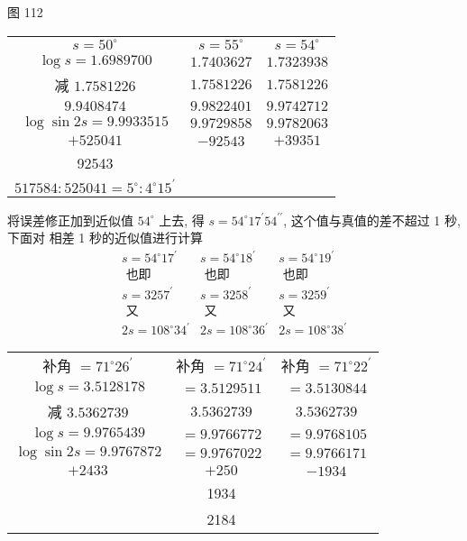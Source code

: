 图 112 

\begin{tabular}{ccc}
$s=50^{\circ}$ & $s=55^{\circ}$ & $s=54^{\circ}$ \\
$\log s=1.6989700$ & $1.7403627$ & $1.7323938$ \\
减 $1.7581226$ & $1.7581226$ & $1.7581226$ \\
\hline $9.9408474$ & $9.9822401$ & $9.9742712$ \\
$\log \sin 2 s=9.9933515$ & $9.9729858$ & $9.9782063$ \\
\hline$+525041$ & $-92543$ & $+39351$ \\
92543 & \\
\hline $517584: 525041=5^{\circ}: 4^{\circ} 15^{\prime}$ &
\end{tabular}

将误差修正加到近似值 $54^{\circ}$ 上去, 得 $s=54^{\circ} 17^{\prime} 54^{\prime \prime}$, 这个值与真值的差不超过 1 秒, 下面对 相差 1 秒的近似值进行计算
\[
\begin{array}{ccc}
s=54^{\circ} 17^{\prime} & s=54^{\circ} 18^{\prime} & s=54^{\circ} 19^{\prime} \\
\text { 也即 } & \text { 也即 } & \text { 也即 } \\
s=3257^{\prime} & s=3258^{\prime} & s=3259^{\prime} \\
\text { 又 } & \text { 又 } & \text { 又 } \\
2 s=108^{\circ} 34^{\prime} & 2 s=108^{\circ} 36^{\prime} & 2 s=108^{\circ} 38^{\prime}
\end{array}
\]
\begin{tabular}{ccc} 
补角 $=71^{\circ} 26^{\prime}$ & 补角 $=71^{\circ} 24^{\prime}$ & 补角 $=71^{\circ} 22^{\prime}$ \\
$\log s=3.5128178$ & $=3.5129511$ & $=3.5130844$ \\
减 $3.5362739$ & $3.5362739$ & $3.5362739$ \\
\hline $\log s=9.9765439$ & $=9.9766772$ & $=9.9768105$ \\
$\log \sin 2 s=9.9767872$ & $=9.9767022$ & $=9.9766171$ \\
\hline$+2433$ & $+250$ & $-1934$ \\
\hline & 1934 & \\
\hline & 2184
\end{tabular}

